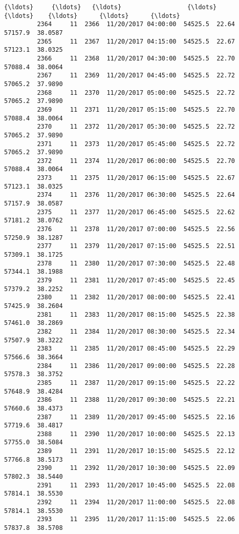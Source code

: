 \documentclass[11pt]{article}
\begin{document}
\begin{Verbatim}[commandchars=\\\{\}]
         {\ldots}     {\ldots}   {\ldots}                  {\ldots}      {\ldots}    {\ldots}      {\ldots}      {\ldots}   
         2364     11  2366  11/20/2017 04:00:00  54525.5  22.64  57157.9  38.0587   
         2365     11  2367  11/20/2017 04:15:00  54525.5  22.67  57123.1  38.0325   
         2366     11  2368  11/20/2017 04:30:00  54525.5  22.70  57088.4  38.0064   
         2367     11  2369  11/20/2017 04:45:00  54525.5  22.72  57065.2  37.9890   
         2368     11  2370  11/20/2017 05:00:00  54525.5  22.72  57065.2  37.9890   
         2369     11  2371  11/20/2017 05:15:00  54525.5  22.70  57088.4  38.0064   
         2370     11  2372  11/20/2017 05:30:00  54525.5  22.72  57065.2  37.9890   
         2371     11  2373  11/20/2017 05:45:00  54525.5  22.72  57065.2  37.9890   
         2372     11  2374  11/20/2017 06:00:00  54525.5  22.70  57088.4  38.0064   
         2373     11  2375  11/20/2017 06:15:00  54525.5  22.67  57123.1  38.0325   
         2374     11  2376  11/20/2017 06:30:00  54525.5  22.64  57157.9  38.0587   
         2375     11  2377  11/20/2017 06:45:00  54525.5  22.62  57181.2  38.0762   
         2376     11  2378  11/20/2017 07:00:00  54525.5  22.56  57250.9  38.1287   
         2377     11  2379  11/20/2017 07:15:00  54525.5  22.51  57309.1  38.1725   
         2378     11  2380  11/20/2017 07:30:00  54525.5  22.48  57344.1  38.1988   
         2379     11  2381  11/20/2017 07:45:00  54525.5  22.45  57379.2  38.2252   
         2380     11  2382  11/20/2017 08:00:00  54525.5  22.41  57425.9  38.2604   
         2381     11  2383  11/20/2017 08:15:00  54525.5  22.38  57461.0  38.2869   
         2382     11  2384  11/20/2017 08:30:00  54525.5  22.34  57507.9  38.3222   
         2383     11  2385  11/20/2017 08:45:00  54525.5  22.29  57566.6  38.3664   
         2384     11  2386  11/20/2017 09:00:00  54525.5  22.28  57578.3  38.3752   
         2385     11  2387  11/20/2017 09:15:00  54525.5  22.22  57648.9  38.4284   
         2386     11  2388  11/20/2017 09:30:00  54525.5  22.21  57660.6  38.4373   
         2387     11  2389  11/20/2017 09:45:00  54525.5  22.16  57719.6  38.4817   
         2388     11  2390  11/20/2017 10:00:00  54525.5  22.13  57755.0  38.5084   
         2389     11  2391  11/20/2017 10:15:00  54525.5  22.12  57766.8  38.5173   
         2390     11  2392  11/20/2017 10:30:00  54525.5  22.09  57802.3  38.5440   
         2391     11  2393  11/20/2017 10:45:00  54525.5  22.08  57814.1  38.5530   
         2392     11  2394  11/20/2017 11:00:00  54525.5  22.08  57814.1  38.5530   
         2393     11  2395  11/20/2017 11:15:00  54525.5  22.06  57837.8  38.5708   
         

\end{Verbatim}
\end{document}

